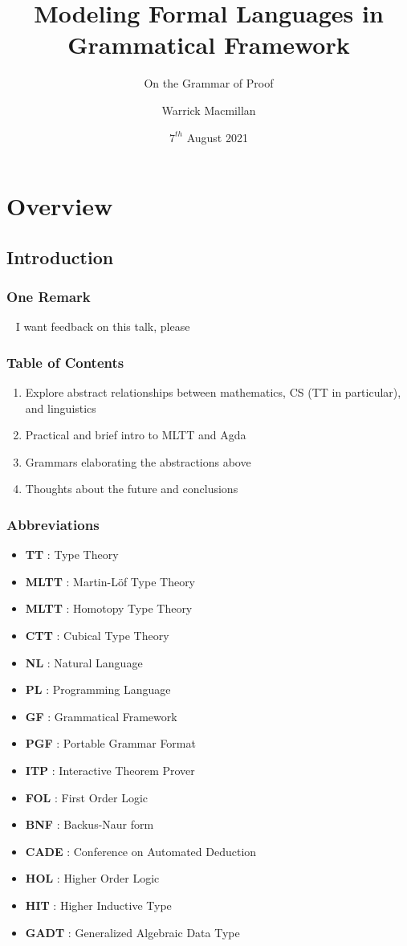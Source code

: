 \documentclass[10pt]{beamer}
\title{Modeling Formal Languages in Grammatical Framework}
\subtitle{On the Grammar of Proof}
\author{Warrick Macmillan}
\date{$7^{th}$ August 2021}
\begin{document}
\begin{frame}
  \titlepage
\end{frame}



\section{Overview}

\subsection{Introduction}

\begin{frame}
\frametitle{One Remark}

\begin{alertblock}{~}
I want feedback on this talk, please
\end{alertblock}

\end{frame}

\begin{frame}
\frametitle{Table of Contents}

\begin{enumerate}

\item Explore abstract relationships between mathematics, CS (TT in
  particular), and linguistics
\item Practical and brief intro to MLTT and Agda
\item Grammars elaborating the abstractions above
\item Thoughts about the future and conclusions
\end{enumerate}
\end{frame}

\begin{frame}
\frametitle{Abbreviations}
\begin{itemize}
\item \textbf{TT} : Type Theory
\item \textbf{MLTT} : Martin-Löf Type Theory
\item \textbf{MLTT} : Homotopy Type Theory
\item \textbf{CTT} : Cubical Type Theory
\item \textbf{NL} : Natural Language
\item \textbf{PL} : Programming Language
\item \textbf{GF} : Grammatical Framework
\item \textbf{PGF} : Portable Grammar Format
\item \textbf{ITP} : Interactive Theorem Prover
\item \textbf{FOL} : First Order Logic
\item \textbf{BNF} : Backus-Naur form
\item \textbf{CADE} : Conference on Automated Deduction
\item \textbf{HOL} : Higher Order Logic
\item \textbf{HIT} : Higher Inductive Type
\item \textbf{GADT} : Generalized Algebraic Data Type
\end{itemize}
\end{frame}
\end{document}
